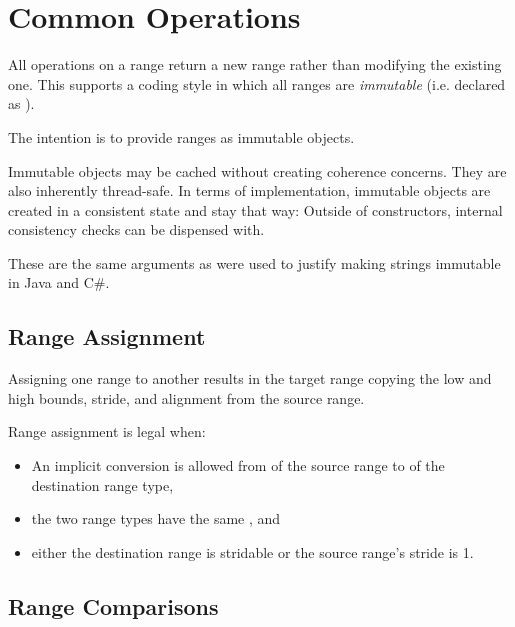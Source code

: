 \section{Common Operations}
\label{Ranges_Common_Operations}

All operations on a range return a new range rather than modifying the existing one.  This
supports a coding style in which all ranges are \emph{immutable} (i.e. declared
as ).  

\begin{rationale}

The intention is to provide ranges as immutable objects.

Immutable objects may be cached without
creating coherence concerns.  They are also inherently thread-safe.  In terms of
implementation, immutable objects are created in a consistent state and stay that way:
Outside of constructors, internal consistency checks can be dispensed with.

These are the same arguments as were used to justify making strings immutable in Java and C\#.

\end{rationale}

\subsection{Range Assignment}
\label{Range_Assignment}

Assigning one range to another results in the target range
copying the low and high bounds, stride, and alignment
from the source range.

Range assignment is legal when:
\begin{itemize}
\item An implicit conversion is allowed from  of the source range
       to  of the destination range type,
\item the two range types have the same , and
\item either the destination range is stridable or the source range's
      stride is 1.
\end{itemize}

\subsection{Range Comparisons}
\label{Range_Comparisons}

